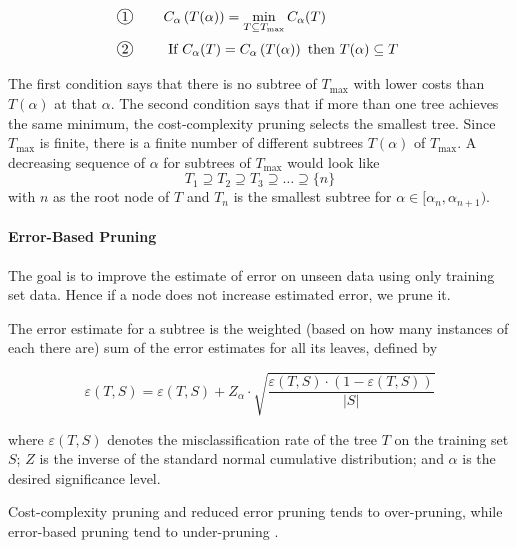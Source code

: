 \begin{align}
    \kreis{1} \qquad & C_{\alpha}\left(T(\alpha)\right) = \min_{T \subseteq T_{\max}} C_\alpha(T) \\
    \kreis{2} \qquad & \text{ If } C_\alpha(T) = C_{\alpha}\left(T(\alpha)\right) \text{ then } T(\alpha) \subseteq T
\end{align}

The first condition says that there is no subtree of $T_{\max}$ with lower costs than $T(\alpha)$ at that $\alpha$. The second condition says that if more than one tree achieves the same minimum, the cost-complexity pruning selects the smallest tree. Since $T_{\max}$ is finite, there is a finite number of different subtrees $T(\alpha)$ of $T_{\max}$. A decreasing sequence of $\alpha$ for subtrees of $T_{\max}$ would look like 
\[
    T_1 \supseteq T_2 \supseteq T_3 \supseteq \dots \supseteq \{n\}
\]
with $n$ as the root node of $T$ and $T_n$ is the smallest subtree for $\alpha \in [\alpha_n, \alpha_{n+1})$.

\paragraph{Error-Based Pruning}

The goal is to improve the estimate of error on unseen data using only training set data. Hence if a node does not increase estimated error, we prune it.

The error estimate for a subtree is the weighted (based on how many instances of each there are) sum of the error estimates for all its leaves, defined by

\begin{equation}
    \varepsilon (T, S) = \varepsilon(T, S) + Z_\alpha \cdot \sqrt{ \frac{\varepsilon(T,S) \cdot \left( 1- \varepsilon(T,S) \right)}{|S|} }
\end{equation}


where $\varepsilon(T, S)$ denotes the misclassification rate of the tree $T$ on the training set $S$; $Z$ is the inverse of the standard normal cumulative distribution; and $\alpha$ is the desired significance level.


\begin{remark}
    Cost-complexity pruning and reduced error pruning tends to over-pruning, while error-based pruning tend to under-pruning \cite[p.68]{rokach2008data}.
\end{remark}



\newpage



